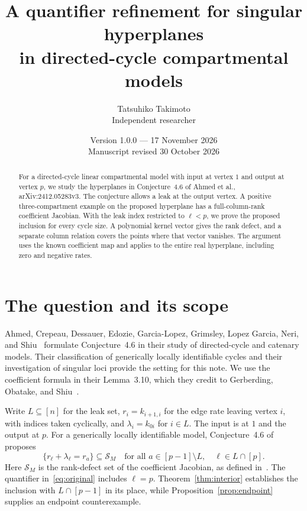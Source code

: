 \documentclass[11pt]{article}
\title{A quantifier refinement for singular hyperplanes\\in directed-cycle compartmental models}
\author{Tatsuhiko Takimoto\\Independent researcher}
\date{Version 1.0.0 --- 17 November 2026\\Manuscript revised 30 October 2026}
\begin{document}
\maketitle

\begin{abstract}
For a directed-cycle linear compartmental model with input at vertex \(1\) and output at vertex \(p\), we study the hyperplanes in Conjecture~4.6 of Ahmed et al., arXiv:2412.05283v3. The conjecture allows a leak at the output vertex. A positive three-compartment example on the proposed hyperplane has a full-column-rank coefficient Jacobian. With the leak index restricted to \(\ell<p\), we prove the proposed inclusion for every cycle size. A polynomial kernel vector gives the rank defect, and a separate column relation covers the points where that vector vanishes. The argument uses the known coefficient map and applies to the entire real hyperplane, including zero and negative rates.
\end{abstract}

\section{The question and its scope}
Ahmed, Crepeau, Dessauer, Edozie, Garcia-Lopez, Grimsley, Lopez Garcia, Neri, and Shiu~\cite{Ahmed} formulate Conjecture~4.6 in their study of directed-cycle and catenary models. Their classification of generically locally identifiable cycles and their investigation of singular loci provide the setting for this note. We use the coefficient formula in their Lemma~3.10, which they credit to Gerberding, Obatake, and Shiu~\cite{GOS}.

Write \(L\subseteq[n]\) for the leak set, \(r_i=k_{i+1,i}\) for the edge rate leaving vertex \(i\), with indices taken cyclically, and \(\lambda_i=k_{0i}\) for \(i\in L\). The input is at \(1\) and the output at \(p\). For a generically locally identifiable model, Conjecture~4.6 of~\cite{Ahmed} proposes
\begin{equation}\label{eq:original}
 \{r_\ell+\lambda_\ell=r_a\}\subseteq\mathcal S_M
 \quad\text{for all }a\in[p-1]\setminus L,\quad
 \ell\in L\cap[p].
\end{equation}
Here \(\mathcal S_M\) is the rank-defect set of the coefficient Jacobian, as defined in~\cite[Definition~4.1]{Ahmed}. The quantifier in~\eqref{eq:original} includes \(\ell=p\). Theorem~\ref{thm:interior} establishes the inclusion with \(L\cap[p-1]\) in its place, while Proposition~\ref{prop:endpoint} supplies an endpoint counterexample.
\end{document}
